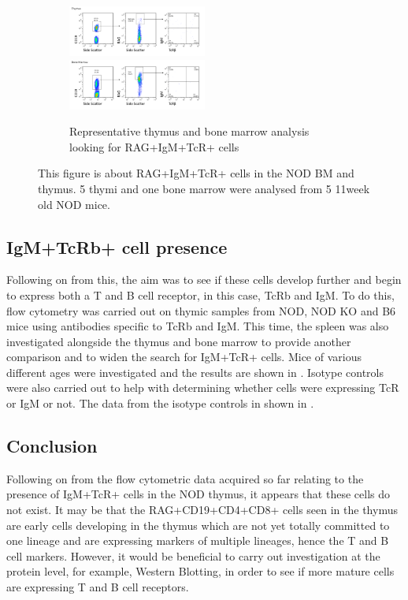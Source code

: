 \begin{figure}
	\begin{subfigure}{\textwidth}
	\includegraphics[width=0.5\textwidth]{Figures/Thy3RAGIgMTcR.png}
	\includegraphics[width=0.5\textwidth]{Figures/BMRAGIgMTcR.png}
	\caption{Representative thymus and bone marrow analysis looking for RAG+IgM+TcR+ cells}
	\label{subfig:BMvThyRAGIgMTcR}
	\end{subfigure}
\caption{This figure is about RAG+IgM+TcR+ cells in the NOD BM and thymus. 5 thymi and one bone marrow were analysed from 5 11week old NOD mice.}
\label{fig:RAGIgMTcRpos}
\end{figure}

\subsection{IgM+TcRb+ cell presence}
Following on from this, the aim was to see if these cells develop further and begin to express both a T and B cell receptor, in this case, TcRb and IgM.
To do this, flow cytometry was carried out on thymic samples from NOD, NOD KO and B6 mice using antibodies specific to TcRb and IgM.
This time, the spleen was also investigated alongside the thymus and bone marrow to provide another comparison and to widen the search for IgM+TcR+ cells.
Mice of various different ages were investigated and the results are shown in  .
Isotype controls were also carried out to help with determining whether cells were expressing TcR or IgM or not.
The data from the isotype controls in shown in .


\subsection{Conclusion}
Following on from the flow cytometric data acquired so far relating to the presence of IgM+TcR+ cells in the NOD thymus, it appears that these cells do not exist. 
It may be that the RAG+CD19+CD4+CD8+ cells seen in the thymus are early cells developing in the thymus which are not yet totally committed to one lineage and are expressing markers of multiple lineages, hence the T and B cell markers.
However, it would be beneficial to carry out investigation at the protein level, for example, Western Blotting, in order to see if more mature cells are expressing T and B cell receptors.




